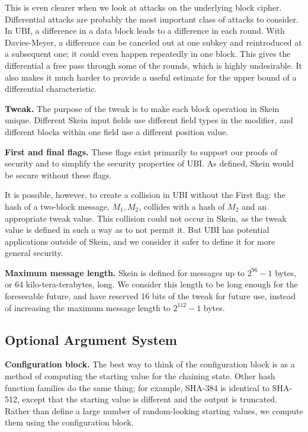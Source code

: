 \documentclass[11pt,twoside]{article}
\begin{document}
This is even clearer when we look at attacks on the underlying block cipher. Differential attacks are probably the most important class of attacks to consider.  In UBI, a difference in a data block leads to a difference in each round.  With Davies-Meyer, a difference can be canceled out at one subkey and reintroduced at a subsequent one; it could even happen repeatedly in one block.  This gives the differential a free pass through some of the rounds, which is highly undesirable.  It also makes it much harder to provide a useful estimate for the upper bound of a differential characteristic.

{\bf Tweak.}  The purpose of the tweak is to make each block operation in Skein unique.  Different Skein input fields use different field types in the modifier, and different blocks within one field use a different position value.

{\bf First and final flags.}  These flags exist primarily to support our proofs of security and to simplify the security properties of UBI.  As defined, Skein would be secure without these flags.

It is possible, however, to create a collision in UBI without the First flag: the hash of a two-block message, $M_1,M_2$, collides with a hash of $M_2$ and an appropriate tweak value.  This collision could not occur in Skein, as the tweak value is defined in such a way as to not permit it.  But UBI has potential applications outside of Skein, and we consider it safer to define it for more general security.

{\bf Maximum message length.}  Skein is defined for messages up to $2^{96}-1$ bytes, or 64 kilo-tera-terabytes, long.  We consider this length to be long enough for the foreseeable future, and have reserved 16 bits of the tweak for future use, instead of increasing the maximum message length to $2^{112}-1$ bytes.

\subsection{Optional Argument System}

{\bf Configuration block.} The best way to think of the configuration block is as a method of computing the starting value for the chaining state.  Other hash function families do the same thing; for example, SHA-384 is identical to SHA-512, except that the starting value is different and the output is truncated.  Rather than define a large number of random-looking starting values, we compute them using the configuration block.
\end{document}
